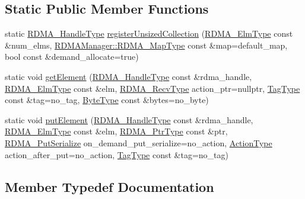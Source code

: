 \subsection*{Static Public Member Functions}
\begin{DoxyCompactItemize}
\item 
static \hyperlink{namespacevt_a10442579ec4e7ebef223818e64bcf908}{R\+D\+M\+A\+\_\+\+Handle\+Type} \hyperlink{structvt_1_1rdma_1_1_r_d_m_a_collection_manager_aada28534174a18a0cfc96de0b7d0d823}{register\+Unsized\+Collection} (\hyperlink{namespacevt_a2c2a902092b72056f70210c159f966f0}{R\+D\+M\+A\+\_\+\+Elm\+Type} const \&num\+\_\+elms, \hyperlink{structvt_1_1rdma_1_1_r_d_m_a_manager_a16e12d11cf7d771df0d3dc6947a4f95c}{R\+D\+M\+A\+Manager\+::\+R\+D\+M\+A\+\_\+\+Map\+Type} const \&map=default\+\_\+map, bool const \&demand\+\_\+allocate=true)
\item 
static void \hyperlink{structvt_1_1rdma_1_1_r_d_m_a_collection_manager_a3c189a72c3359cf3614c2477e9c1d919}{get\+Element} (\hyperlink{namespacevt_a10442579ec4e7ebef223818e64bcf908}{R\+D\+M\+A\+\_\+\+Handle\+Type} const \&rdma\+\_\+handle, \hyperlink{namespacevt_a2c2a902092b72056f70210c159f966f0}{R\+D\+M\+A\+\_\+\+Elm\+Type} const \&elm, \hyperlink{namespacevt_1_1rdma_aa07fa86d8eca8853254b40fc0e565726}{R\+D\+M\+A\+\_\+\+Recv\+Type} action\+\_\+ptr=nullptr, \hyperlink{namespacevt_a84ab281dae04a52a4b243d6bf62d0e52}{Tag\+Type} const \&tag=no\+\_\+tag, \hyperlink{namespacevt_aab8d55968084610ce3b17057981e9300}{Byte\+Type} const \&bytes=no\+\_\+byte)
\item 
static void \hyperlink{structvt_1_1rdma_1_1_r_d_m_a_collection_manager_a0c39db9a1b61df2815a5bdcb9ab49bfa}{put\+Element} (\hyperlink{namespacevt_a10442579ec4e7ebef223818e64bcf908}{R\+D\+M\+A\+\_\+\+Handle\+Type} const \&rdma\+\_\+handle, \hyperlink{namespacevt_a2c2a902092b72056f70210c159f966f0}{R\+D\+M\+A\+\_\+\+Elm\+Type} const \&elm, \hyperlink{namespacevt_a9e2c953286c7616f7c218e9951790776}{R\+D\+M\+A\+\_\+\+Ptr\+Type} const \&ptr, \hyperlink{namespacevt_abeb0129c92a5721f6f2c01b621f149fe}{R\+D\+M\+A\+\_\+\+Put\+Serialize} on\+\_\+demand\+\_\+put\+\_\+serialize=no\+\_\+action, \hyperlink{namespacevt_ae0a5a7b18cc99d7b732cb4d44f46b0f3}{Action\+Type} action\+\_\+after\+\_\+put=no\+\_\+action, \hyperlink{namespacevt_a84ab281dae04a52a4b243d6bf62d0e52}{Tag\+Type} const \&tag=no\+\_\+tag)
\end{DoxyCompactItemize}


\subsection{Member Typedef Documentation}
\mbox{\label{structvt_1_1rdma_1_1_r_d_m_a_collection_manager_a4618a654161e92d2fcc2ab099eba9b65}} 

